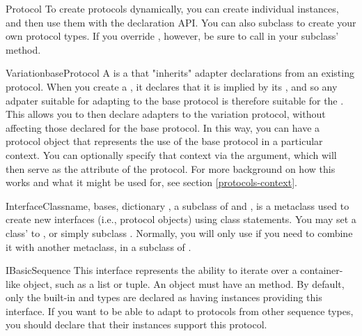 \begin{verbatim%
}
\begin{verbatim%
}
\begin{verbatim%
}
\begin{verbatim%
}
\begin{verbatim%
}
\begin{verbatim%
}
\begin{classdesc*}{Protocol}
To create protocols dynamically, you can create individual 
instances, and then use them with the declaration API.  You can also subclass
 to create your own protocol types.  If you override
, however, be sure to call 
in your subclass'  method.
\end{classdesc*}

\begin{classdesc}{Variation}{baseProtocol }
A  is a  that "inherits" adapter declarations
from an existing protocol.  When you create a , it declares
that it is implied by its , and so any adpater suitable for
adapting to the base protocol is therefore suitable for the .
This allows you to then declare adapters to the variation protocol, without
affecting those declared for the base protocol.  In this way, you can have a
protocol object that represents the use of the base protocol in a particular
context.  You can optionally specify that context via the 
argument, which will then serve as the  attribute of the
protocol.  For more background on how this works and what it might be used for,
see section \ref{protocols-context}.
\end{classdesc}


\begin{classdesc}{InterfaceClass}{name, bases, dictionary}
, a subclass of  and , is a
metaclass used to create new interfaces (i.e., protocol objects) using class
statements.  You may set a class'  to
, or simply subclass .  Normally, you
will only use  if you need to combine it with another
metaclass, in a subclass of .
\end{classdesc}

\begin{classdesc}{IBasicSequence} 
This interface represents the ability to iterate over a container-like object,
such as a list or tuple.  An  object must have an
 method.  By default, only the built-in  and
 types are declared as having instances providing this interface.
If you want to be able to adapt to  protocols from other
sequence types, you should declare that their instances support this protocol.
\end{classdesc}


\end{verbatim%
}
\end{verbatim%
}
\end{verbatim%
}
\end{verbatim%
}
\end{verbatim%
}
\end{verbatim%
}
